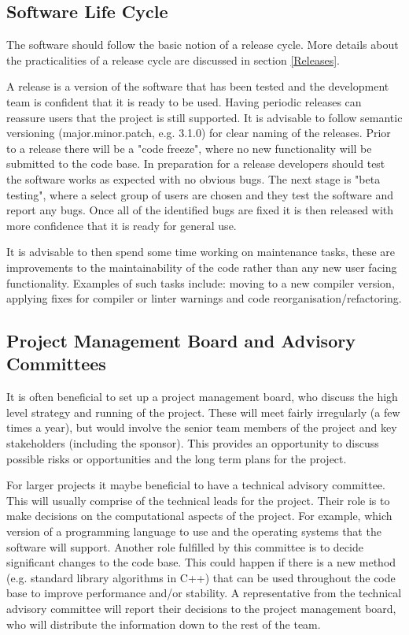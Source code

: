 \documentclass[jnr]{iosart2x}
\begin{document}
\begin{itemzie}
\subsection{Software Life Cycle}
\label{lc}

The software should follow the basic notion of a release cycle. More details about the practicalities of a release cycle are discussed in section \ref{Releases}.

A release is a version of the software that has been tested and the development team is confident that it is ready to be used.
Having periodic releases can reassure users that the project is still supported.
It is advisable to follow semantic versioning \cite{Semantic_Versioning} (major.minor.patch, e.g. 3.1.0) for clear naming of the releases.
Prior to a release there will be a "code freeze", where no new functionality will be submitted to the code base.
In preparation for a release developers should test the software works as expected with no obvious bugs.
The next stage is "beta testing", where a select group of users are chosen and they test the software and report any bugs.
Once all of the identified bugs are fixed it is then released with more confidence that it is ready for general use.

It is advisable to then spend some time working on maintenance tasks, these are improvements to the maintainability of the code rather than any new user facing functionality.
Examples of such tasks include: moving to a new compiler version, applying fixes for compiler or linter warnings and code reorganisation/refactoring.

\subsection{Project Management Board and Advisory Committees}
\label{PM big}

It is often beneficial to set up a project management board, who discuss the high level strategy and running of the project.
These will meet fairly irregularly (a few times a year), but would involve the senior team members of the project and key stakeholders (including the sponsor).
This provides an opportunity to discuss possible risks or opportunities and the long term plans for the project.

For larger projects it maybe beneficial to have a technical advisory committee.
This will usually comprise of the technical leads for the project.
Their role is to make decisions on the computational aspects of the project.
For example, which version of a programming language to use and the operating systems that the software will support.
Another role fulfilled by this committee is to decide significant changes to the code base.
This could happen if there is a new method (e.g. standard library algorithms in C++) that can be used throughout the code base to improve performance and/or stability.
A representative from the technical advisory committee will report their decisions to the project management board, who will distribute the information down to the rest of the team.


\end{itemzie}
\end{document}
